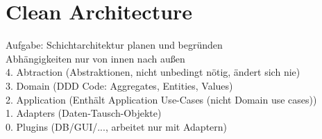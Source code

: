 \chapter{Clean Architecture}
Aufgabe: Schichtarchitektur planen und begründen\\

Abhängigkeiten nur von innen nach außen\\
4. Abtraction (Abstraktionen, nicht unbedingt nötig, ändert sich nie)\\
3. Domain (DDD Code: Aggregates, Entities, Values)\\
2. Application (Enthält Application Use-Cases (nicht Domain use cases))\\
1. Adapters (Daten-Tausch-Objekte)\\
0. Plugins (DB/GUI/..., arbeitet nur mit Adaptern)
